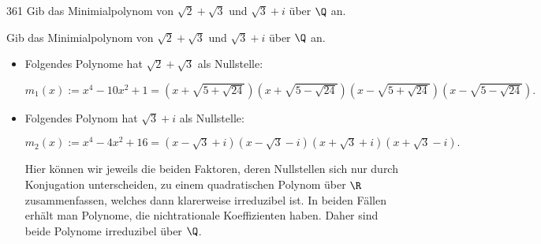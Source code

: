 \begin{algebraUE}{361}
Gib das Minimialpolynom von $\sqrt{2} + \sqrt{3}$ und $\sqrt{3} + i$ über $\Q$ an.
\end{algebraUE}

\begin{solution}
  Gib das Minimialpolynom von $\sqrt{2} + \sqrt{3}$ und $\sqrt{3} + i$ über $\Q$ an.

  \begin{itemize}
  \item Folgendes Polynome hat $\sqrt{2} + \sqrt{3}$ als Nullstelle:

  $m_1(x) := x^4 - 10x^2 + 1 = (x + \sqrt{5+\sqrt{24}})(x + \sqrt{5-\sqrt{24}})(x - \sqrt{5+\sqrt{24}})(x - \sqrt{5-\sqrt{24}}).$
  
  \item Folgendes Polynom hat $\sqrt{3} + i$ als Nullstelle:

  $m_2(x) := x^4 - 4x^2 + 16 = (x - \sqrt{3} + i)(x - \sqrt{3} - i)(x + \sqrt{3} + i)(x + \sqrt{3} - i).$

  Hier können wir jeweils die beiden Faktoren, deren Nullstellen sich nur durch Konjugation unterscheiden, zu einem quadratischen Polynom über $\R$ zusammenfassen, welches dann klarerweise irreduzibel ist. In beiden Fällen erhält man Polynome, die nichtrationale Koeffizienten haben. Daher sind beide Polynome irreduzibel über $\Q$.
  \end{itemize}
\end{solution}
